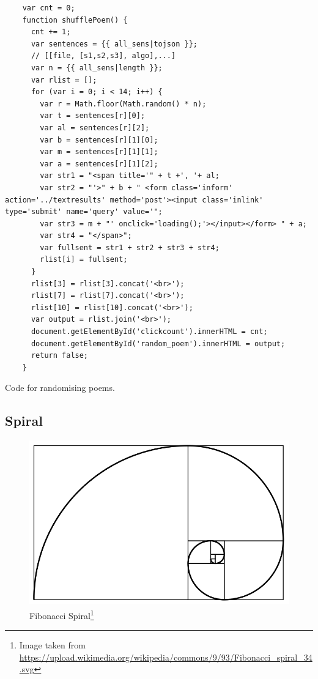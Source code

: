 \begin{listing}[h!]
  \begin{verbatim}
    var cnt = 0;
    function shufflePoem() {
      cnt += 1;
      var sentences = {{ all_sens|tojson }};
      // [[file, [s1,s2,s3], algo],...]
      var n = {{ all_sens|length }};
      var rlist = [];
      for (var i = 0; i < 14; i++) {
        var r = Math.floor(Math.random() * n);
        var t = sentences[r][0];
        var al = sentences[r][2];
        var b = sentences[r][1][0];
        var m = sentences[r][1][1];
        var a = sentences[r][1][2];
        var str1 = "<span title='" + t +', '+ al;
        var str2 = "'>" + b + " <form class='inform' action='../textresults' method='post'><input class='inlink' type='submit' name='query' value='";
        var str3 = m + "' onclick='loading();'></input></form> " + a;
        var str4 = "</span>";
        var fullsent = str1 + str2 + str3 + str4;
        rlist[i] = fullsent;
      }
      rlist[3] = rlist[3].concat('<br>');
      rlist[7] = rlist[7].concat('<br>');
      rlist[10] = rlist[10].concat('<br>');
      var output = rlist.join('<br>');
      document.getElementById('clickcount').innerHTML = cnt;
      document.getElementById('random_poem').innerHTML = output;
      return false;
    }
  \end{verbatim}
\caption{Code for randomising poems.}
\label{code:rpoemsjs}
\end{listing}


\subsection{Spiral}

\begin{figure}[!htbp] %
  \centering
  \includegraphics[width=0.5\linewidth]{images/Fibonacci}
\caption[Fibonacci Spiral]{Fibonacci Spiral\footnote{Image taken from \url{https://upload.wikimedia.org/wikipedia/commons/9/93/Fibonacci_spiral_34.svg}}}
\label{img:Fibonacci}
\end{figure}



